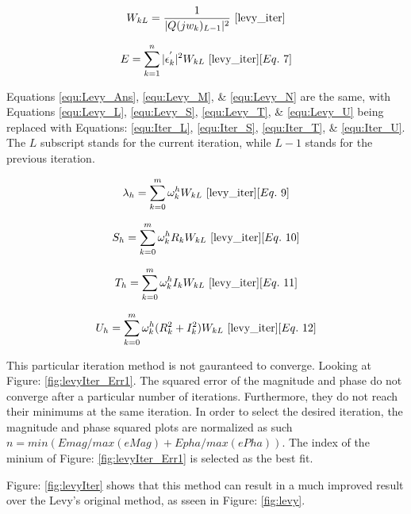 \begin{equation}
\label{equ:iter_Weight}
W_{kL} = \frac{1}{|Q(jw_k)_{L-1}|^2}
~\cite{levy_iter}
\end{equation}

\begin{equation}
\label{equ:iter_Err}
E = \sum_{k=1}^{n} |\epsilon _k ^{'}|^2W_{kL}
~\cite{levy_iter}[Eq.~7]
\end{equation}

Equations \eqref{equ:Levy_Ans}, \eqref{equ:Levy_M}, \& \eqref{equ:Levy_N} are the same, with Equations \eqref{equ:Levy_L}, \eqref{equ:Levy_S}, \eqref{equ:Levy_T}, \& \eqref{equ:Levy_U} being replaced with Equations: \eqref{equ:Iter_L}, \eqref{equ:Iter_S}, \eqref{equ:Iter_T}, \& \eqref{equ:Iter_U}.
The $L$ subscript stands for the current iteration, while $L-1$ stands for the previous iteration.

\begin{equation}
\label{equ:Iter_L}
\lambda _h = \sum_{k=0}^{m} \omega _k ^hW_{kL}
~\cite{levy_iter}[Eq.~9]
\end{equation}

\begin{equation}
\label{equ:Iter_S}
S_h = \sum_{k=0}^{m} \omega _k ^h R_kW_{kL}
~\cite{levy_iter}[Eq.~10]
\end{equation}

\begin{equation}
\label{equ:Iter_T}
T_h = \sum_{k=0}^{m} \omega _k ^h I_kW_{kL}
~\cite{levy_iter}[Eq.~11]
\end{equation}

\begin{equation}
\label{equ:Iter_U}
U_h = \sum_{k=0}^{m} \omega _k ^h (R_k ^2 + I_k ^2)W_{kL}
~\cite{levy_iter}[Eq.~12]
\end{equation}


This particular iteration method is not gauranteed to converge. Looking at Figure: \ref{fig:levyIter_Err1}. The squared error of the magnitude and phase do not converge after a particular number of iterations. Furthermore, they do not reach their minimums at the same iteration. In order to select the desired iteration, the magnitude and phase squared plots are normalized as such $n = min(Emag/max(eMag) + Epha/max(ePha))$. The index of the minium of Figure: \ref{fig:levyIter_Err1} is selected as the best fit.




Figure: \ref{fig:levyIter} shows that this method can result in a much improved result over the Levy's original method, as sseen in Figure: \ref{fig:levy}.

